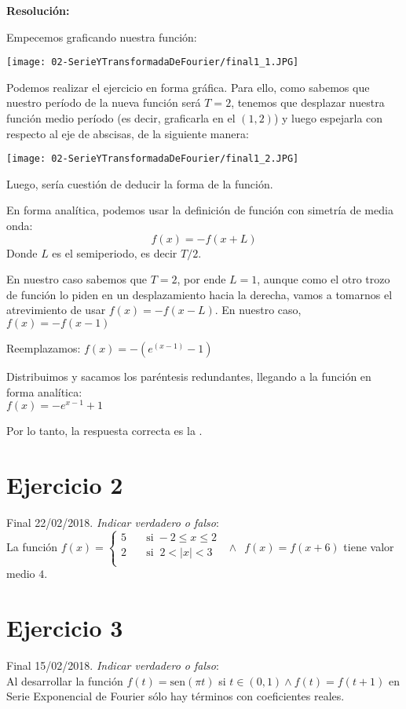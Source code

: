 \documentclass[11pt]{article}
\def\sen{\mathrm{sen}}
\newcommand*\circled[1]{\tikz[baseline=(char.base)]{
		\node[shape=circle,draw,inner sep=2pt] (char) {#1};}}
\begin{document}
	\textbf{Resolución:}
	
	Empecemos graficando nuestra función:\\
	\begin{center}
		\texttt{[image: 02-SerieYTransformadaDeFourier/final1\_1.JPG]}
	\end{center}

	Podemos realizar el ejercicio en forma gráfica. Para ello, como sabemos que nuestro período de la nueva función será $T=2$, tenemos que desplazar nuestra función medio período (es decir, graficarla en el $(1,2)$) y luego espejarla con respecto al eje de abscisas, de la siguiente manera:\\
	
	\begin{center}
		\texttt{[image: 02-SerieYTransformadaDeFourier/final1\_2.JPG]}
	\end{center}

	Luego, sería cuestión de deducir la forma de la función.
	
	En forma analítica, podemos usar la definición de función con simetría de media onda:	
	$$f(x)=-f(x+L)$$ Donde $L$ es el semiperiodo, es decir $T/2$.
	
	En nuestro caso sabemos que $T=2$, por ende $L=1$, aunque como el otro trozo de función lo piden en un desplazamiento hacia la derecha, vamos a tomarnos el atrevimiento de usar $f(x)=-f(x-L)$. En nuestro caso, $f(x)=-f(x-1)$
	
	Reemplazamos: $f(x)=-\left(e^{(x-1)}-1\right)$
	
	Distribuimos y sacamos los paréntesis redundantes, llegando a la función en forma analítica:\\
	$\boxed{f(x)=-e^{x-1}+1}$
	
	Por lo tanto, la respuesta correcta es la \fcolorbox{black}{yellow}{\circled{b}}.
	\section{Ejercicio 2}
	Final 22/02/2018. \textit{Indicar verdadero o falso}:\\
	La función $   
	f(x) = 
	\begin{cases}
	5 &\quad\text{si}\;-2\leq x \leq 2\\
	2 &\quad\text{si}\;\;2< |x| < 3 \\
	\end{cases}
	\enspace\wedge\enspace
	f(x)=f(x+6)
	$
	tiene valor medio $4$.
	\section{Ejercicio 3}
	Final 15/02/2018. \textit{Indicar verdadero o falso}:\\
	Al desarrollar la función $f(t)=\sen\left(\pi t\right)$ si $t\in(0,1) \wedge f(t)=f(t+1)$ en Serie Exponencial de Fourier sólo hay términos con coeficientes reales.
\end{document}
